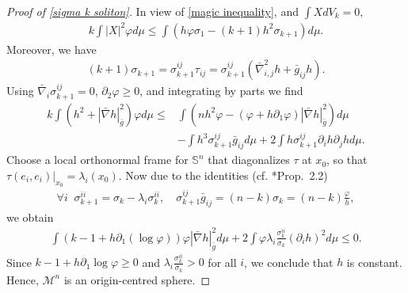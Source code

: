 \documentclass[12pt]{amsart}
\theoremstyle{definition}
\numberwithin{equation}{section}
\newcommand{\M}{\mathcal{M}}
\newcommand{\Sn}{\mathbb{S}^n}
\theoremstyle{remark}
\numberwithin{equation}{section}
\begin{document}
\begin{proof}[Proof of \autoref{sigma k soliton}]
In view of \autoref{magic inequality}, and $\int X dV_k=0,$ 
\begin{align*}
k\int |X|^2\varphi d\mu\leq \int (h\varphi\sigma_1-(k+1)h^2\sigma_{k+1}) d\mu.
\end{align*}
Moreover, we have
\begin{align*}
(k+1)\sigma_{k+1}=\sigma_{k+1}^{ij}\tau_{ij} = \sigma_{k+1}^{ij} (\bar{\nabla}^2_{i,j}h+\bar{g}_{ij}h).
\end{align*}
Using $\bar{\nabla}_i\sigma_{k+1}^{ij}=0$, $\partial_2\varphi\geq0$, and integrating by parts we find
\begin{align*}
k\int (h^2+|\bar{\nabla} h|^2_{\bar g})\varphi d\mu
\leq& \int (nh^2\varphi-(\varphi+h\partial_1 \varphi)|\bar{\nabla} h|^2_{\bar g}) d\mu\\
&-\int h^3\sigma_{k+1}^{ij}\bar{g}_{ij} d\mu+2\int h\sigma_{k+1}^{ij}\partial_ih\partial_jh d\mu.
\end{align*}
Choose a local orthonormal frame for $\Sn$ that diagonalizes $\tau$ at $x_0$, so that $\tau(e_i,e_i)|_{x_0}=\lambda_i(x_0)$.
Now due to the identities (cf. \cite{HS99}*{Prop.~2.2})
\begin{align*}
\forall i \;\; \sigma_{k+1}^{ii}=\sigma_{k}-\lambda_i\sigma_k^{ii},\quad 
\sigma_{k+1}^{ij}\bar{g}_{ij}=(n-k)\sigma_k=(n-k)\frac{\varphi}{h},
\end{align*}
we obtain
\begin{align*}
\int (k-1+h\partial_1(\log\varphi))\varphi|\bar{\nabla} h|^2_{\bar g} d\mu +2\int \varphi\lambda_i\frac{\sigma_k^{ii}}{\sigma_{k}}(\partial_ih)^2 d\mu \leq 0.
\end{align*}
Since $k-1+h\partial_1 \log\varphi \geq 0$ and $\lambda_i\frac{\sigma_k^{ii}}{\sigma_{k}} > 0$ for all $i$, we conclude that $h$ is constant. Hence, $\M^n$ is an origin-centred sphere.
\end{proof}

\end{document}
